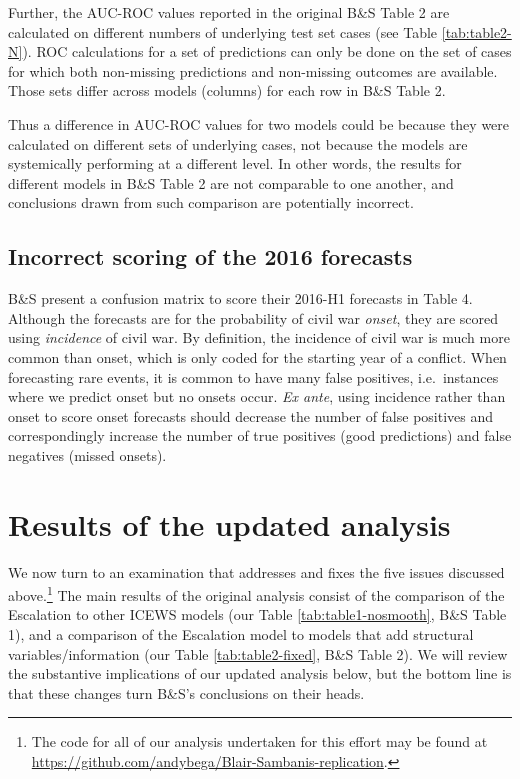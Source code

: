\documentclass[
]{article}
\begin{document}
Further, the AUC-ROC values reported in the original B\&S Table 2 are calculated on different numbers of underlying test set cases (see Table \ref{tab:table2-N}). ROC calculations for a set of predictions can only be done on the set of cases for which both non-missing predictions and non-missing outcomes are available. Those sets differ across models (columns) for each row in B\&S Table 2.

Thus a difference in AUC-ROC values for two models could be because they were calculated on different sets of underlying cases, not because the models are systemically performing at a different level. In other words, the results for different models in B\&S Table 2 are not comparable to one another, and conclusions drawn from such comparison are potentially incorrect.

\hypertarget{incorrect-scoring-of-the-2016-forecasts}{%
\subsection{Incorrect scoring of the 2016 forecasts}\label{incorrect-scoring-of-the-2016-forecasts}}

B\&S present a confusion matrix to score their 2016-H1 forecasts in Table 4. Although the forecasts are for the probability of civil war \emph{onset}, they are scored using \emph{incidence} of civil war. By definition, the incidence of civil war is much more common than onset, which is only coded for the starting year of a conflict. When forecasting rare events, it is common to have many false positives, i.e.~instances where we predict onset but no onsets occur. \emph{Ex ante}, using incidence rather than onset to score onset forecasts should decrease the number of false positives and correspondingly increase the number of true positives (good predictions) and false negatives (missed onsets).

\hypertarget{results-of-the-updated-analysis}{%
\section{Results of the updated analysis}\label{results-of-the-updated-analysis}}

We now turn to an examination that addresses and fixes the five issues discussed above.\footnote{The code for all of our analysis undertaken for this effort may be found at \url{https://github.com/andybega/Blair-Sambanis-replication}.} The main results of the original analysis consist of the comparison of the Escalation to other ICEWS models (our Table \ref{tab:table1-nosmooth}, B\&S Table 1), and a comparison of the Escalation model to models that add structural variables/information (our Table \ref{tab:table2-fixed}, B\&S Table 2). We will review the substantive implications of our updated analysis below, but the bottom line is that these changes turn B\&S's conclusions on their heads.
\end{document}
